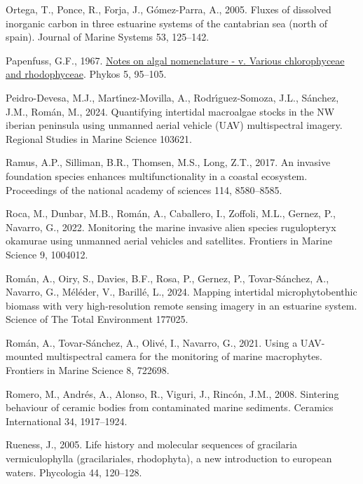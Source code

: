 \documentclass[
  letterpaper,
  DIV=11,
  numbers=noendperiod]{scrartcl}
\newlength{\cslhangindent}
\newenvironment{CSLReferences}[2] %
 {\begin{list}{}{%
  \setlength{\itemindent}{0pt}
  \setlength{\leftmargin}{0pt}
  \setlength{\parsep}{0pt}
  \ifodd #1
   \setlength{\leftmargin}{\cslhangindent}
   \setlength{\itemindent}{-1\cslhangindent}
  \fi
  \setlength{\itemsep}{#2\baselineskip}}}
 {\end{list}}
\begin{document}
\begin{CSLReferences}{1}{0}
Ortega, T., Ponce, R., Forja, J., Gómez-Parra, A., 2005. Fluxes of
dissolved inorganic carbon in three estuarine systems of the cantabrian
sea (north of spain). Journal of Marine Systems 53, 125--142.

Papenfuss, G.F., 1967.
\href{https://marinespecies.org/aphia.php?p=sourcedetails&id=303450}{Notes
on algal nomenclature - v. Various chlorophyceae and rhodophyceae}.
Phykos 5, 95--105.

Peidro-Devesa, M.J., Martı́nez-Movilla, A., Rodrı́guez-Somoza, J.L.,
Sánchez, J.M., Román, M., 2024. Quantifying intertidal macroalgae stocks
in the NW iberian peninsula using unmanned aerial vehicle (UAV)
multispectral imagery. Regional Studies in Marine Science 103621.

Ramus, A.P., Silliman, B.R., Thomsen, M.S., Long, Z.T., 2017. An
invasive foundation species enhances multifunctionality in a coastal
ecosystem. Proceedings of the national academy of sciences 114,
8580--8585.

Roca, M., Dunbar, M.B., Román, A., Caballero, I., Zoffoli, M.L., Gernez,
P., Navarro, G., 2022. Monitoring the marine invasive alien species
rugulopteryx okamurae using unmanned aerial vehicles and satellites.
Frontiers in Marine Science 9, 1004012.

Román, A., Oiry, S., Davies, B.F., Rosa, P., Gernez, P., Tovar-Sánchez,
A., Navarro, G., Méléder, V., Barillé, L., 2024. Mapping intertidal
microphytobenthic biomass with very high-resolution remote sensing
imagery in an estuarine system. Science of The Total Environment 177025.

Román, A., Tovar-Sánchez, A., Olivé, I., Navarro, G., 2021. Using a
UAV-mounted multispectral camera for the monitoring of marine
macrophytes. Frontiers in Marine Science 8, 722698.

Romero, M., Andrés, A., Alonso, R., Viguri, J., Rincón, J.M., 2008.
Sintering behaviour of ceramic bodies from contaminated marine
sediments. Ceramics International 34, 1917--1924.

Rueness, J., 2005. Life history and molecular sequences of gracilaria
vermiculophylla (gracilariales, rhodophyta), a new introduction to
european waters. Phycologia 44, 120--128.


\end{CSLReferences}
\end{document}
